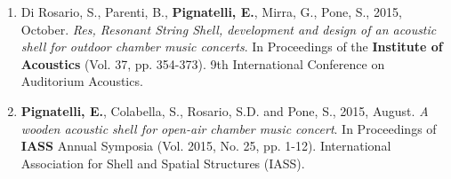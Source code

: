 \begin{enumerate}[leftmargin=0.45cm, itemsep=0em, topsep=0.5em, parsep=0.2em]
    \item Di Rosario, S., Parenti, B., \textbf{Pignatelli, E.}, Mirra, G., Pone, S., 2015, October. \textit{Res, Resonant String Shell, development and design of an acoustic shell for outdoor chamber music concerts}. In Proceedings of the \textbf{Institute of Acoustics} (Vol. 37, pp. 354-373). 9th International Conference on Auditorium Acoustics.
    \item \textbf{Pignatelli, E.}, Colabella, S., Rosario, S.D. and Pone, S., 2015, August. \textit{A wooden acoustic shell for open-air chamber music concert}. In Proceedings of \textbf{IASS} Annual Symposia (Vol. 2015, No. 25, pp. 1-12). International Association for Shell and Spatial Structures (IASS).
\end{enumerate}
